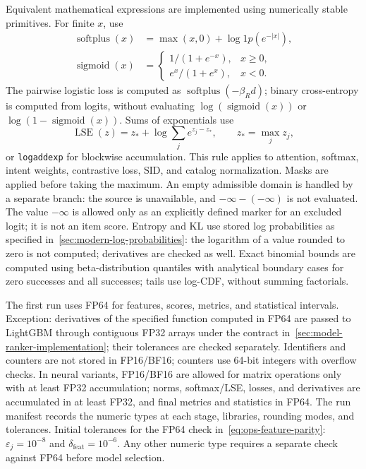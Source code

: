 \documentclass[12pt,a4paper]{article}
\newcommand{\code}[1]{{\ttfamily\small\nolinkurl{#1}}}
\newcommand{\eps}{\varepsilon}
\DeclareMathOperator{\sigmoid}{sigmoid}
\theoremstyle{plainru}
\begin{document}
Equivalent mathematical expressions are implemented using numerically stable
primitives. For finite $x$, use
\begin{align}
\operatorname{softplus}(x)&=\max(x,0)+\log1p(e^{-|x|}),\\
\sigmoid(x)&=\begin{cases}
1/(1+e^{-x}),&x\ge0,\\
e^x/(1+e^x),&x<0.
\end{cases}
\end{align}
The pairwise logistic loss is computed as
$\operatorname{softplus}(-\beta_R d)$; binary cross-entropy is computed
from logits, without evaluating $\log(\sigmoid(x))$ or
$\log(1-\sigmoid(x))$. Sums of exponentials use
\begin{equation}\label{eq:ops-stable-lse}
\operatorname{LSE}(z)=z_*+\log\sum_j e^{z_j-z_*},
\qquad z_*=\max_j z_j,
\end{equation}
or \code{logaddexp} for blockwise accumulation. This rule applies
to attention, softmax, intent weights, contrastive loss, SID,
and catalog normalization. Masks are applied before taking the maximum. An empty admissible domain
is handled by a separate branch: the source is unavailable, and
$-\infty-(-\infty)$ is not evaluated. The value $-\infty$ is allowed only as an explicitly
defined marker for an excluded logit; it is not an item score.
Entropy and KL use stored log probabilities
as specified in~\ref{sec:modern-log-probabilities}: the logarithm of a value rounded to zero
is not computed; derivatives are checked as well.
Exact binomial bounds are computed using beta-distribution quantiles
with analytical boundary cases for zero successes and all successes;
tails use log-CDF, without summing factorials.

The first run uses FP64 for features, scores,
metrics, and statistical intervals. Exception: derivatives of the specified function computed in FP64
are passed to LightGBM through contiguous
FP32 arrays under the contract in~\ref{sec:model-ranker-implementation};
their tolerances are checked separately. Identifiers and counters are not
stored in FP16/BF16; counters use 64-bit integers
with overflow checks. In neural variants, FP16/BF16
are allowed for matrix operations only with at least FP32 accumulation;
norms, softmax/LSE, losses, and derivatives are accumulated in at least FP32,
and final metrics and statistics in FP64. The run manifest records
the numeric types at each stage, libraries, rounding modes, and tolerances.
Initial tolerances for the FP64 check in~\eqref{eq:ops-feature-parity}:
$\eps_j=10^{-8}$ and $\delta_{\mathrm{feat}}=10^{-6}$.
Any other numeric type requires a separate check against FP64 before model selection.
\end{document}
